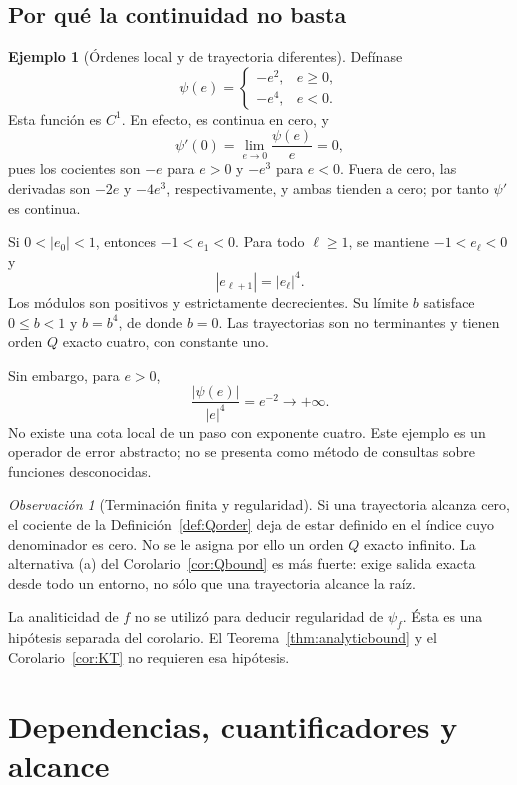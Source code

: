 \documentclass[11pt,a4paper]{article}
\numberwithin{equation}{section}
\theoremstyle{definition}
\newtheorem{example}[theorem]{Ejemplo}
\theoremstyle{remark}
\newtheorem{remark}[theorem]{Observación}
\begin{document}
\subsection{Por qué la continuidad no basta}
\begin{example}[Órdenes local y de trayectoria diferentes]\label{ex:orders}
Defínase
\[
\psi(e)=\begin{cases}-e^2,&e\ge0,\\-e^4,&e<0.\end{cases}
\]
Esta función es $C^1$. En efecto, es continua en cero, y
\[
\psi'(0)=\lim_{e\to0}\frac{\psi(e)}e=0,
\]
pues los cocientes son $-e$ para $e>0$ y $-e^3$ para $e<0$. Fuera de cero, las derivadas son $-2e$ y $-4e^3$, respectivamente, y ambas tienden a cero; por tanto $\psi'$ es continua.

Si $0<|e_0|<1$, entonces $-1<e_1<0$. Para todo $\ell\ge1$, se mantiene $-1<e_\ell<0$ y
\[
|e_{\ell+1}|=|e_\ell|^4.
\]
Los módulos son positivos y estrictamente decrecientes. Su límite $b$ satisface $0\le b<1$ y $b=b^4$, de donde $b=0$. Las trayectorias son no terminantes y tienen orden $Q$ exacto cuatro, con constante uno.

Sin embargo, para $e>0$,
\[
\frac{|\psi(e)|}{|e|^4}=e^{-2}\longrightarrow+\infty.
\]
No existe una cota local de un paso con exponente cuatro. Este ejemplo es un operador de error abstracto; no se presenta como método de consultas sobre funciones desconocidas.
\end{example}

\begin{remark}[Terminación finita y regularidad]
Si una trayectoria alcanza cero, el cociente de la Definición~\ref{def:Qorder} deja de estar definido en el índice cuyo denominador es cero. No se le asigna por ello un orden $Q$ exacto infinito. La alternativa (a) del Corolario~\ref{cor:Qbound} es más fuerte: exige salida exacta desde todo un entorno, no sólo que una trayectoria alcance la raíz.

La analiticidad de $f$ no se utilizó para deducir regularidad de $\psi_f$. Ésta es una hipótesis separada del corolario. El Teorema~\ref{thm:analyticbound} y el Corolario~\ref{cor:KT} no requieren esa hipótesis.
\end{remark}

\par\bigskip
\section{Dependencias, cuantificadores y alcance}\label{sec:dependencies}
\end{document}

